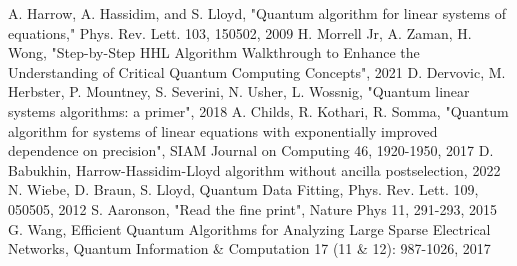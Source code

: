 
\begin{thebibliography}{00}
 A. Harrow, A. Hassidim, and S. Lloyd, "Quantum algorithm for linear systems of equations," Phys. Rev. Lett. 103, 150502, 2009
 H. Morrell Jr, A. Zaman, H. Wong, "Step-by-Step HHL Algorithm Walkthrough to Enhance the Understanding of Critical Quantum Computing Concepts", 2021
 D. Dervovic, M. Herbster, P. Mountney, S. Severini, N. Usher, L. Wossnig, "Quantum linear systems algorithms: a primer", 2018
 A. Childs, R. Kothari, R. Somma, "Quantum algorithm for systems of linear equations with exponentially improved dependence on precision", SIAM Journal on Computing 46, 1920-1950, 2017
 D. Babukhin, Harrow-Hassidim-Lloyd algorithm without ancilla postselection, 2022
 N. Wiebe, D. Braun, S. Lloyd, Quantum Data Fitting, Phys. Rev. Lett. 109, 050505, 2012
 S. Aaronson, "Read the fine print",  Nature Phys 11, 291-293, 2015 
 G. Wang, Efficient Quantum Algorithms for Analyzing Large Sparse Electrical Networks, Quantum Information \& Computation 17 (11 \& 12): 987-1026, 2017 

\end{thebibliography}



\begin{comment}
    HHL-2009: 
    step by step: 
    primer: https://arxiv.org/abs/1802.08227
    exponential imprved dependencs on precision: https://arxiv.org/abs/1511.02306
    without ancilla: https://arxiv.org/abs/2208.02200
    data fitting:
    fineprint: https://inspirehep.net/literature/1834407
    large electrical networks: https://arxiv.org/abs/1311.1851
    qiskit example: https://learn.qiskit.org/course/ch-applications/solving-linear-systems-of-equations-using-hhl-and-its-qiskit-implementation#example1
\end{comment}
